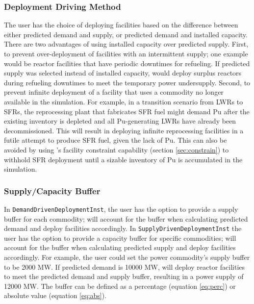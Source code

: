     \subsubsection{\textbf{Deployment Driving Method}}
    The user has the choice of deploying facilities based on the difference 
    between either predicted demand and supply, or predicted demand and 
    installed capacity. 
    There are two advantages of using installed capacity over predicted 
    supply. 
    First, to prevent over-deployment of facilities with an
    intermittent supply; one example would be reactor
    facilities that have periodic downtimes for refueling. 
    If predicted supply was selected instead of installed capacity, 
    \deploy would deploy surplus reactors during refueling downtimes to 
    meet the temporary power undersupply.
    Second, to prevent infinite deployment of a facility that uses 
    a commodity no longer available in the simulation. 
    For example, in a transition scenario from \glspl{LWR} to \glspl{SFR}, 
    the reprocessing plant that fabricates \gls{SFR} fuel might demand 
    Pu after the existing inventory is depleted 
    and all Pu-generating \glspl{LWR} have already been decommissioned. 
    This will result in \deploy deploying infinite reprocessing 
    facilities in a futile attempt to produce \gls{SFR} fuel, given the lack of Pu.
    This can also be avoided by using \deploy's facility constraint capability 
    (section \ref{sec:constrain})
    to withhold \gls{SFR} deployment until a sizable inventory of Pu 
    is accumulated in the simulation. 
    
    \subsubsection{\textbf{Supply/Capacity Buffer}}
    In \texttt{DemandDrivenDeploymentInst}, the user has the option 
    to provide a supply buffer for each commodity; \deploy will account 
    for the buffer when calculating predicted demand and 
    deploy facilities accordingly.
    In \texttt{SupplyDrivenDeploymentInst} the user has the option 
    to provide a capacity buffer for specific commodities; 
    \deploy will account 
    for the buffer when calculating predicted supply and 
    deploy facilities accordingly.
    For example, the user could set the power commodity's supply buffer 
    to be 2000 MW. 
    If predicted demand is 10000 MW, \deploy will deploy reactor 
    facilities to meet the predicted demand and supply buffer, resulting 
    in a power supply of 12000 MW.  
    The buffer can be defined as a percentage (equation \ref{eq:perc}) 
    or absolute value (equation \ref{eq:abs}). 
    
